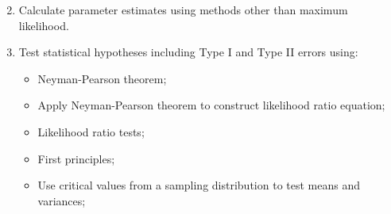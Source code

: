 \begin{outcomes}
	\begin{enumerate}
  \setcounter{enumi}{1}
	\item	Calculate parameter estimates using methods other than maximum likelihood.
	\item	Test statistical hypotheses including Type I and Type II errors using:
		\begin{itemize}
		\item	Neyman-Pearson theorem;
		\item[]	Apply Neyman-Pearson theorem to construct likelihood ratio equation;
		\item	Likelihood ratio tests;
		\item	First principles;
		\item[]	Use critical values from a sampling distribution to test means and variances;
		\end{itemize}	
	\end{enumerate}
\end{outcomes}	
